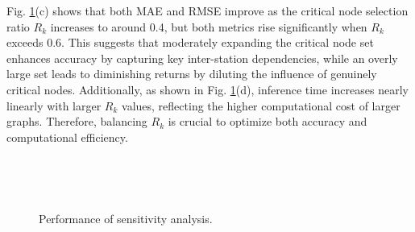 \documentclass[lettersize,journal]{IEEEtran}
\begin{document}

Fig. \ref{figure:sensitivity_patch}(c) shows that both MAE and RMSE improve as the critical node selection ratio $R_k$ increases to around 0.4, but both metrics rise significantly when $R_k$ exceeds 0.6. This suggests that moderately expanding the critical node set enhances accuracy by capturing key inter-station dependencies, while an overly large set leads to diminishing returns by diluting the influence of genuinely critical nodes. Additionally, as shown in Fig. \ref{figure:sensitivity_patch}(d), inference time increases nearly linearly with larger $R_k$ values, reflecting the higher computational cost of larger graphs. Therefore, balancing $R_k$ is crucial to optimize both accuracy and computational efficiency.


\begin{figure}[t!]
	\centering
	 ~
	
	 ~ 
	\caption{Performance of sensitivity analysis.}
        \vspace{-10pt}
	\label{figure:sensitivity_patch}
\end{figure}
\end{document}
